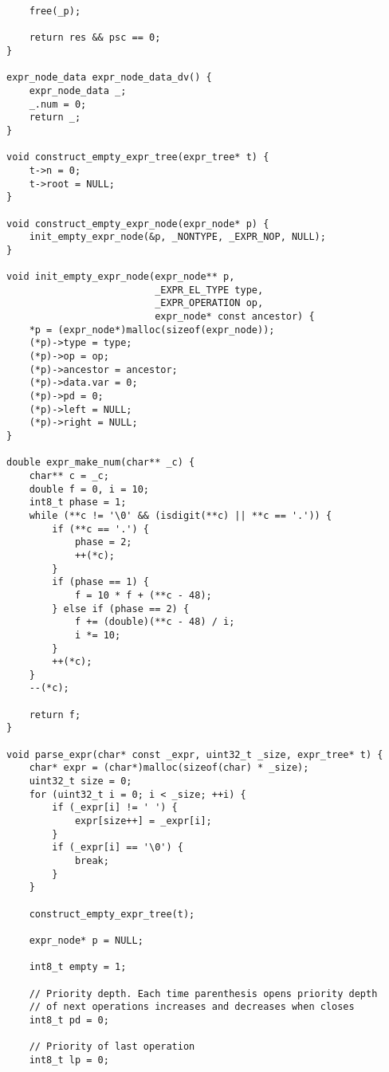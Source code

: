 \documentclass[a4paper]{article}
\newcounter{i}
\begin{document}
\begin{enumerate}[label=\textbf{\arabic*}.]
\begin{verbatim}
    free(_p);

    return res && psc == 0;
}

expr_node_data expr_node_data_dv() {
    expr_node_data _;
    _.num = 0;
    return _;
}

void construct_empty_expr_tree(expr_tree* t) {
    t->n = 0;
    t->root = NULL;
}

void construct_empty_expr_node(expr_node* p) {
    init_empty_expr_node(&p, _NONTYPE, _EXPR_NOP, NULL);
}

void init_empty_expr_node(expr_node** p, 
                          _EXPR_EL_TYPE type,
                          _EXPR_OPERATION op,
                          expr_node* const ancestor) {
    *p = (expr_node*)malloc(sizeof(expr_node));
    (*p)->type = type;
    (*p)->op = op;
    (*p)->ancestor = ancestor;
    (*p)->data.var = 0;
    (*p)->pd = 0;
    (*p)->left = NULL;
    (*p)->right = NULL;
}

double expr_make_num(char** _c) {
    char** c = _c;
    double f = 0, i = 10;
    int8_t phase = 1;
    while (**c != '\0' && (isdigit(**c) || **c == '.')) {
        if (**c == '.') {
            phase = 2;
            ++(*c);
        }
        if (phase == 1) {
            f = 10 * f + (**c - 48);
        } else if (phase == 2) {
            f += (double)(**c - 48) / i;
            i *= 10;
        }
        ++(*c);
    }
    --(*c);

    return f;
}

void parse_expr(char* const _expr, uint32_t _size, expr_tree* t) {
    char* expr = (char*)malloc(sizeof(char) * _size);
    uint32_t size = 0;
    for (uint32_t i = 0; i < _size; ++i) {
        if (_expr[i] != ' ') {
            expr[size++] = _expr[i];
        }
        if (_expr[i] == '\0') {
            break;
        }
    }
      
    construct_empty_expr_tree(t);

    expr_node* p = NULL;

    int8_t empty = 1;

    // Priority depth. Each time parenthesis opens priority depth 
    // of next operations increases and decreases when closes 
    int8_t pd = 0;

    // Priority of last operation
    int8_t lp = 0;


\end{verbatim}
\end{enumerate}
\end{document}
